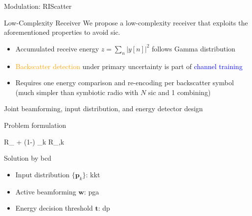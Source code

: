 \documentclass[presentation,xcolor={table},9pt]{beamer}
\begin{document}
\begin{section}{Modulation: RIScatter}
	\begin{frame}{Low-Complexity Receiver}
		We propose a low-complexity receiver that exploits the aforementioned properties to avoid \gls{sic}.
		\begin{figure}[!t]
			\centering
			\subfloat{
				\resizebox{0.42\linewidth}{!}{
					
				}
			}
			\subfloat{
				\resizebox{0.58\linewidth}{!}{
					
				}
			}
			\label{fg:receiver}
		\end{figure}
		\vspace{0.5cm}
		\begin{itemize}
			\item Accumulated receive energy $z=\sum_{n} \bigl\lvert y[n] \bigr\rvert^2$ follows Gamma distribution
			\item \textcolor{orange}{Backscatter detection} under primary uncertainty is part of \textcolor{blue}{channel training}
			\item Requires one energy comparison and re-encoding per backscatter symbol (much simpler than symbiotic radio with $N$ \gls{sic} and 1 combining)
		\end{itemize}
	\end{frame}

	\begin{frame}{Joint beamforming, input distribution, and energy detector design}
		\begin{block}{Problem formulation}
			\vspace{-0.25cm}
			\begin{maxi*}
				{}{\rho R_ + (1-\rho) \sum\nolimits_{k} R_{,k}}{}{}
			\end{maxi*}
		\end{block}
		\begin{exampleblock}{Solution by \gls{bcd}}
			\begin{itemize}
				\item Input distribution $\{\mathbf{p}_k\}$: \gls{kkt}
				\item Active beamforming $\mathbf{w}$: \gls{pga}
				\item Energy decision threshold $\mathbf{t}$: \gls{dp}
			\end{itemize}
		\end{exampleblock}
	\end{frame}


\end{section}
\end{document}

